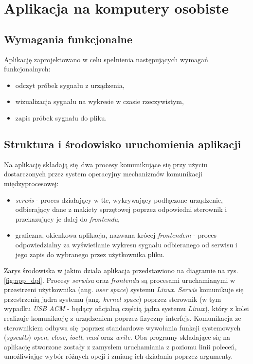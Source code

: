 
\chapter{Aplikacja na komputery osobiste}

\section{Wymagania funkcjonalne}

Aplikację zaprojektowano w celu spełnienia następujących wymagań funkcjonalnych:

\begin{itemize}
    \item odczyt próbek sygnału z urządzenia,
    \item wizualizacja sygnału na wykresie w czasie rzeczywistym,
    \item zapis próbek sygnału do pliku.
\end{itemize}


\section{Struktura i środowisko uruchomienia aplikacji}

Na aplikację składają się dwa procesy komunikujące się przy użyciu dostarczonych przez system
operacyjny mechanizmów komunikacji międzyprocesowej:

\begin{itemize}
    \item \textit{serwis} - proces działający w tle, wykrywający podłączone urządzenie, 
    odbierający dane z makiety sprzętowej poprzez odpowiedni sterownik i przekazujący je 
    dalej do \textit{frontendu},

    \item graficzna, okienkowa aplikacja, nazwana krócej \textit{frontendem} - 
     proces odpowiedzialny za wyświetlanie wykresu sygnału odbieranego
    od serwisu i jego zapis do wybranego przez użytkownika pliku.
\end{itemize}

Zarys środowiska w jakim działa aplikacja przedstawiono na diagramie na rys. \ref{fig:app_dpl}.
Procesy \textit{serwisu} oraz \textit{frontendu} są procesami uruchamianymi w przestrzeni użytkownika
(ang. \textit{user space}) systemu \textit{Linux}. \textit{Serwis} komunikuje się przestrzenią 
jądra systemu (ang. \textit{kernel space}) poprzez sterownik 
(w tym wypadku \textit{USB ACM} - będący oficjalną częścią jądra systemu \textit{Linux}), 
który z kolei realizuje komunikację z urządzeniem poprzez fizyczny interfejs. 
Komunikacja ze sterownikiem odbywa się poprzez standardowe wywołania funkcji systemowych (\textit{syscalls}) 
\textit{open}, \textit{close}, \textit{ioctl}, \textit{read} oraz \textit{write}.
Oba programy składające się na aplikację stworzone zostały z zamysłem uruchamiania z poziomu linii poleceń,
umożliwiając wybór różnych opcji i zmianę ich działania poprzez argumenty.

